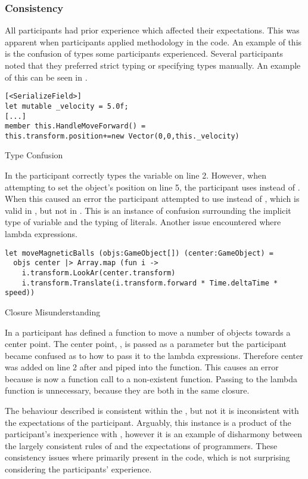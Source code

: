 \subsubsection{Consistency}
All participants had prior \cs experience which affected their expectations. This was apparent when participants applied \cs methodology in the \fs code. An example of this is the confusion of types some participants experienced. Several participants noted that they preferred strict typing or specifying types manually. An example of this can be seen in .

\begin{listing}[H]
\begin{verbatim}
[<SerializeField>]
let mutable _velocity = 5.0f;
[...]
member this.HandleMoveForward() =
this.transform.position+=new Vector(0,0,this._velocity)
\end{verbatim}
\caption{Type Confusion}
\label{lst:type-conf}
\end{listing}

In  the participant correctly types the  variable on line 2. However, when attempting to set the object's position on line 5, the participant uses  instead of . When this caused an error the participant attempted to use  instead of , which is valid in \cs, but not in \fs. This is an instance of confusion surrounding the implicit type of variable and the typing of literals. Another issue encountered where lambda expressions.

\begin{listing}[H]
\begin{verbatim}
let moveMagneticBalls (objs:GameObject[]) (center:GameObject) =
  objs center |> Array.map (fun i ->
    i.transform.LookAr(center.transform)
    i.transform.Translate(i.transform.forward * Time.deltaTime * speed))
\end{verbatim}
\caption{Closure Misunderstanding}
\label{lst:clos-mis}
\end{listing}

In  a participant has defined a function to move a number of objects towards a center point. The center point, , is passed as a parameter but the participant became confused as to how to pass it to the lambda expressions. Therefore center was added on line 2 after  and piped into the  function. This causes an error because  is now a function call to a non-existent function. Passing  to the lambda function is unnecessary, because they are both in the same closure.

The behaviour described is consistent within the \fs, but not it is inconsistent with the expectations of the participant. Arguably, this instance is a product of the participant's inexperience with \fs, however it is an example of disharmony between the largely consistent rules of \fs and the expectations of programmers. These consistency issues where primarily present in the \fs code, which is not surprising considering the participants' experience.
